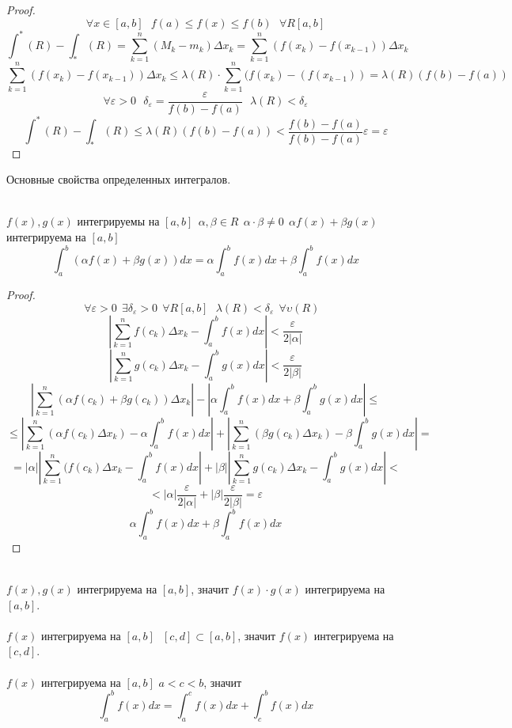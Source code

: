 \begin{proof}
  \[\forall x \in [a,b] ~~~ f(a) \le f(x) \le f(b) ~~~ \forall R[a,b]\]
  \[
    \int^* (R) - \int_* (R) = \sum_{k = 1}^{n} (M_k - m_k) \Delta x_k
    = \sum_{k = 1}^{n} (f(x_k) - f(x_{k-1})) \Delta x_k
  \]
  \[
    \sum_{k = 1}^{n} (f(x_k) - f(x_{k-1})) \Delta x_k \le \lambda(R) \cdot
    \sum_{k = 1}^{n} (f(x_k) - (f(x_{k - 1})) = \lambda (R) (f(b) - f(a))
  \]
  \[
    \forall \varepsilon > 0 ~~~ \delta_\varepsilon = \frac{\varepsilon}{f(b) -
    f(a)} ~~~ \lambda (R) < \delta_\varepsilon
  \]
  \[
  \int^* (R) - \int_* (R) \le \lambda (R) (f(b) - f(a)) <
  \frac{f(b)-f(a)}{f(b)-f(a)} \varepsilon = \varepsilon
  \]
\end{proof}
\begin{title}[\Large]
    Основные свойства определенных интегралов.
\end{title}

\\
$f(x), g(x)$ интегрируемы на $[a,b] ~~ \alpha , \beta \in R ~~
\alpha \cdot \beta \not= 0 ~~ \alpha f(x) + \beta g(x)$ интегрируема на $[a,b]$
\[
    \int_a^b (\alpha f(x) + \beta g(x))dx = \alpha \int_a^b f(x)dx
    + \beta \int_a^b f(x)dx
\]

\begin{proof}
    \[
        \forall\varepsilon>0 ~~ \exists\delta_{\varepsilon}>0 ~~ \forall R[a,b]
        ~~~ \lambda(R) < \delta_{\varepsilon} ~~ \forall\upsilon(R) ~~~
    \]
    \[
        \left| \sum_{k=1}^{n} f(c_k)\Delta x_k -
        \int_a^b f(x)dx \right| < \frac{\varepsilon}{2|\alpha|}
    \]
    \[
        \left| \sum_{k=1}^{n} g(c_k)\Delta x_k -
        \int_a^b g(x)dx \right| < \frac{\varepsilon}{2|\beta|}
    \]
    \[
        \left| \sum_{k=1}^{n} (\alpha f(c_k) + \beta g(c_k))\Delta x_k \right| -
        \left| \alpha \int_a^b f(x)dx + \beta \int_a^b g(x)dx \right| \le
    \]
    \[
      \le \left| \sum_{k=1}^{n} (\alpha f(c_k) \Delta x_k) -
      \alpha \int_a^b f(x)dx \right| + \left| \sum_{k=1}^{n} (\beta g(c_k)
      \Delta x_k) - \beta \int_a^b g(x)dx \right| =
    \]
    \[
      = |\alpha| \left| \sum_{k=1}^{n} (f(c_k) \Delta x_k -
      \int_a^b f(x)dx \right| + |\beta| \left| \sum_{k=1}^{n} g(c_k)
      \Delta x_k - \int_a^b g(x)dx \right| <
    \]
    \[
        < |\alpha| \frac{\varepsilon}{2|\alpha|} + |\beta|
        \frac{\varepsilon}{2|\beta|} = \varepsilon
    \]
    \[\alpha \int_a^b f(x)dx + \beta \int_a^b f(x)dx\]
\end{proof}

\\
$f(x),g(x)$ интегрируема на $[a,b]$, значит $f(x) \cdot g(x)$
интегрируема на $[a,b]$.\\
\\
 $f(x)$ интегрируема на $[a,b] ~~~ [c,d] \subset [a,b]$, значит
$f(x)$ интегрируема на $[c,d]$.\\
\\
$f(x)$ интегрируема на $[a,b]$ $a < c < b$, значит
    \[\int_a^b f(x)dx = \int_a^c f(x)dx + \int_c^b f(x)dx\]

